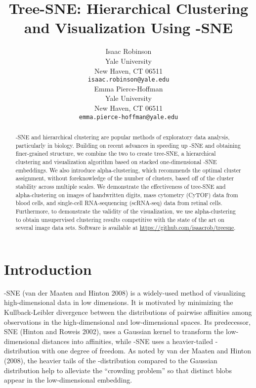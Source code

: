 \documentclass{article}
\title{Tree-SNE: Hierarchical Clustering \\ and Visualization Using -SNE}
\author{
  Isaac Robinson \\
  Yale University\\
  New Haven, CT 06511 \\
  \texttt{isaac.robinson@yale.edu} \\
\And
 Emma Pierce-Hoffman \\
  Yale University\\
  New Haven, CT 06511 \\
  \texttt{emma.pierce-hoffman@yale.edu} \\
}
\begin{document}
\maketitle

\begin{abstract}
-SNE and hierarchical clustering are popular methods of exploratory data analysis, particularly in biology. Building on recent advances in speeding up -SNE and obtaining finer-grained structure, we combine the two to create tree-SNE, a hierarchical clustering and visualization algorithm based on stacked one-dimensional -SNE embeddings. We also introduce alpha-clustering, which recommends the optimal cluster assignment, without foreknowledge of the number of clusters, based off of the cluster stability across multiple scales. We demonstrate the effectiveness of tree-SNE and alpha-clustering on images of handwritten digits, mass cytometry (CyTOF) data from blood cells, and single-cell RNA-sequencing (scRNA-seq) data from retinal cells. Furthermore, to demonstrate the validity of the visualization, we use alpha-clustering to obtain unsupervised clustering results competitive with the state of the art on several image data sets. Software is available at \url{https://github.com/isaacrob/treesne}. 
\end{abstract}



\section{Introduction}

-SNE (van der Maaten and Hinton 2008) is a widely-used method of visualizing high-dimensional data in low dimensions. It is motivated by minimizing the Kullback-Leibler divergence between the distributions of pairwise affinities among observations in the high-dimensional and low-dimensional spaces. Its predecessor, SNE (Hinton and Roweis 2002), uses a Gaussian kernel to transform the low-dimensional distances into affinities, while -SNE uses a heavier-tailed -distribution with one degree of freedom. As noted by van der Maaten and Hinton (2008), the heavier tails of the -distribution compared to the Gaussian distribution help to alleviate the “crowding problem” so that distinct blobs appear in the low-dimensional embedding. 
\end{document}
